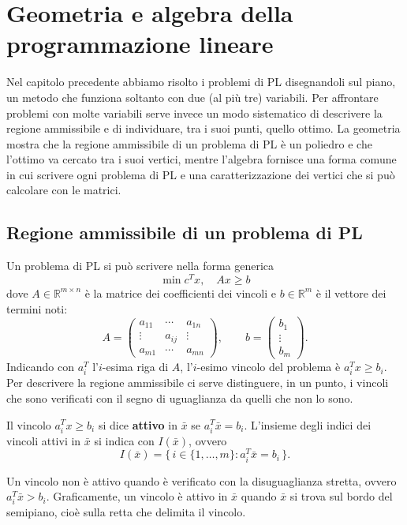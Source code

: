 \chapter{Geometria e algebra della programmazione lineare}\label{ch:geoalg}
Nel capitolo precedente abbiamo risolto i problemi di PL disegnandoli sul piano, un metodo che funziona soltanto con due (al più tre) variabili. Per affrontare problemi con molte variabili serve invece un modo sistematico di descrivere la regione ammissibile e di individuare, tra i suoi punti, quello ottimo. La geometria mostra che la regione ammissibile di un problema di PL è un poliedro e che l'ottimo va cercato tra i suoi vertici, mentre l'algebra fornisce una forma comune in cui scrivere ogni problema di PL e una caratterizzazione dei vertici che si può calcolare con le matrici.

\section{Regione ammissibile di un problema di PL}
Un problema di PL si può scrivere nella forma generica
\[
\min c^T x, \quad A x \ge b
\]
dove $A \in \mathbb{R}^{m \times n}$ è la matrice dei coefficienti dei vincoli e $b \in \mathbb{R}^m$ è il vettore dei termini noti:
\[
A = \begin{pmatrix} a_{11} & \cdots & a_{1n} \\ \vdots & a_{ij} & \vdots \\ a_{m1} & \cdots & a_{mn} \end{pmatrix}, \qquad
b = \begin{pmatrix} b_1 \\ \vdots \\ b_m \end{pmatrix}.
\]
Indicando con $a_i^T$ l'$i$-esima riga di $A$, l'$i$-esimo vincolo del problema è $a_i^T x \ge b_i$. Per descrivere la regione ammissibile ci serve distinguere, in un punto, i vincoli che sono verificati con il segno di uguaglianza da quelli che non lo sono.

\begin{definizione}\label{def:attivo}
Il vincolo $a_i^T x \ge b_i$ si dice \textbf{attivo} in $\bar{x}$ se $a_i^T \bar{x} = b_i$. L'insieme degli indici dei vincoli attivi in $\bar{x}$ si indica con $I(\bar{x})$, ovvero
\[
I(\bar{x}) = \{\, i \in \{1, \dots, m\} : a_i^T \bar{x} = b_i \,\}.
\]
\end{definizione}

Un vincolo non è attivo quando è verificato con la disuguaglianza stretta, ovvero $a_i^T \bar{x} > b_i$. Graficamente, un vincolo è attivo in $\bar{x}$ quando $\bar{x}$ si trova sul bordo del semipiano, cioè sulla retta che delimita il vincolo.

